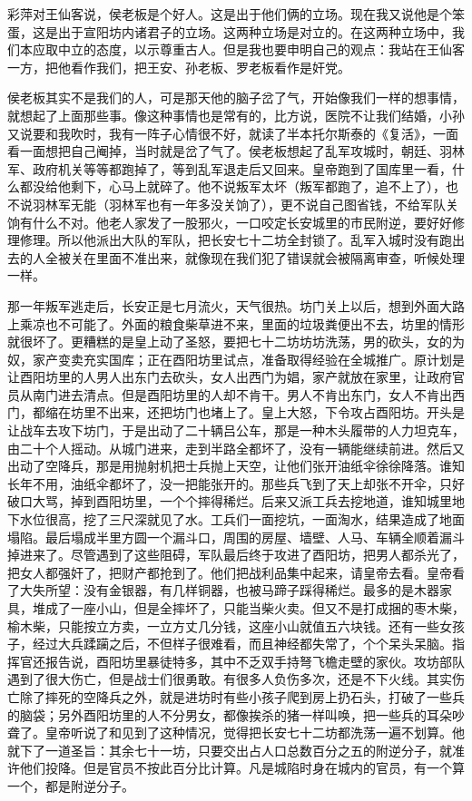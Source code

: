 彩萍对王仙客说，侯老板是个好人。这是出于他们俩的立场。现在我又说他是个笨蛋，这是出于宣阳坊内诸君子的立场。这两种立场是对立的。在这两种立场中，我们本应取中立的态度，以示尊重古人。但是我也要申明自己的观点：我站在王仙客一方，把他看作我们，把王安、孙老板、罗老板看作是奸党。 

侯老板其实不是我们的人，可是那天他的脑子岔了气，开始像我们一样的想事情，就想起了上面那些事。像这种事情也是常有的，比方说，医院不让我们结婚，小孙又说要和我吹时，我有一阵子心情很不好，就读了半本托尔斯泰的《复活》，一面看一面想把自己阉掉，当时就是岔了气了。侯老板想起了乱军攻城时，朝廷、羽林军、政府机关等等都跑掉了，等到乱军退走后又回来。皇帝跑到了国库里一看，什么都没给他剩下，心马上就碎了。他不说叛军太坏（叛军都跑了，追不上了），也不说羽林军无能（羽林军也有一年多没关饷了），更不说自己图省钱，不给军队关饷有什么不对。他老人家发了一股邪火，一口咬定长安城里的市民附逆，要好好修理修理。所以他派出大队的军队，把长安七十二坊全封锁了。乱军入城时没有跑出去的人全被关在里面不准出来，就像现在我们犯了错误就会被隔离审查，听候处理一样。 

那一年叛军逃走后，长安正是七月流火，天气很热。坊门关上以后，想到外面大路上乘凉也不可能了。外面的粮食柴草进不来，里面的垃圾粪便出不去，坊里的情形就很坏了。更糟糕的是皇上动了圣怒，要把七十二坊坊坊洗荡，男的砍头，女的为奴，家产变卖充实国库；正在酉阳坊里试点，准备取得经验在全城推广。原计划是让酉阳坊里的人男人出东门去砍头，女人出西门为娼，家产就放在家里，让政府官员从南门进去清点。但是酉阳坊里的人却不肯干。男人不肯出东门，女人不肯出西门，都缩在坊里不出来，还把坊门也堵上了。皇上大怒，下令攻占酉阳坊。开头是让战车去攻下坊门，于是出动了二十辆吕公车，那是一种木头履带的人力坦克车，由二十个人摇动。从城门进来，走到半路全都坏了，没有一辆能继续前进。然后又出动了空降兵，那是用抛射机把士兵抛上天空，让他们张开油纸伞徐徐降落。谁知长年不用，油纸伞都坏了，没一把能张开的。那些兵飞到了天上却张不开伞，只好破口大骂，掉到酉阳坊里，一个个摔得稀烂。后来又派工兵去挖地道，谁知城里地下水位很高，挖了三尺深就见了水。工兵们一面挖坑，一面淘水，结果造成了地面塌陷。最后塌成半里方圆一个漏斗口，周围的房屋、墙壁、人马、车辆全顺着漏斗掉进来了。尽管遇到了这些阻碍，军队最后终于攻进了酉阳坊，把男人都杀光了，把女人都强奸了，把财产都抢到了。他们把战利品集中起来，请皇帝去看。皇帝看了大失所望：没有金银器，有几样铜器，也被马蹄子踩得稀烂。最多的是木器家具，堆成了一座小山，但是全摔坏了，只能当柴火卖。但又不是打成捆的枣木柴，榆木柴，只能按立方卖，一立方丈几分钱，这座小山就值五六块钱。还有一些女孩子，经过大兵蹂躏之后，不但样子很难看，而且神经都失常了，个个呆头呆脑。指挥官还报告说，酉阳坊里暴徒特多，其中不乏双手持弩飞檐走壁的家伙。攻坊部队遇到了很大伤亡，但是战士们很勇敢。有很多人负伤多次，还是不下火线。其实伤亡除了摔死的空降兵之外，就是进坊时有些小孩子爬到房上扔石头，打破了一些兵的脑袋；另外酉阳坊里的人不分男女，都像挨杀的猪一样叫唤，把一些兵的耳朵吵聋了。皇帝听说了和见到了这种情况，觉得把长安七十二坊都洗荡一遍不划算。他就下了一道圣旨：其余七十一坊，只要交出占人口总数百分之五的附逆分子，就准许他们投降。但是官员不按此百分比计算。凡是城陷时身在城内的官员，有一个算一个，都是附逆分子。 

